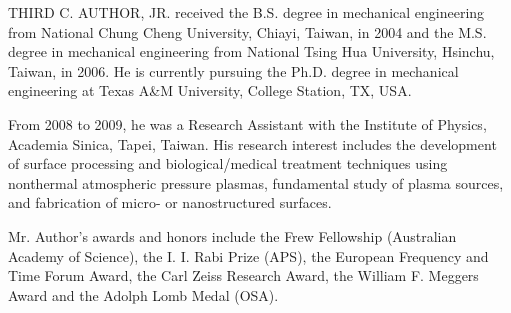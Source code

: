 \documentclass{IEEEjmw}
\begin{document}
\begin{IEEEbiography}{THIRD C. AUTHOR, JR.}{\space} received the B.S. degree in mechanical engineering from National Chung Cheng University, Chiayi, Taiwan, in 2004 and the M.S. degree in mechanical engineering from National Tsing Hua University, Hsinchu, Taiwan, in 2006. He is currently pursuing the Ph.D. degree in mechanical engineering at Texas A\&M University, College Station, TX, USA.

    From 2008 to 2009, he was a Research Assistant with the Institute of Physics, Academia Sinica, Tapei, Taiwan. His research interest includes the development of surface processing and biological/medical treatment techniques using nonthermal atmospheric pressure plasmas, fundamental study of plasma sources, and fabrication of micro- or nanostructured surfaces. 

   Mr. Author's awards and honors include the Frew Fellowship (Australian Academy of Science), the I. I. Rabi Prize (APS), the European Frequency and Time Forum Award, the Carl Zeiss Research Award, the William F. Meggers Award and the Adolph Lomb Medal (OSA).
\end{IEEEbiography}
\end{document}
